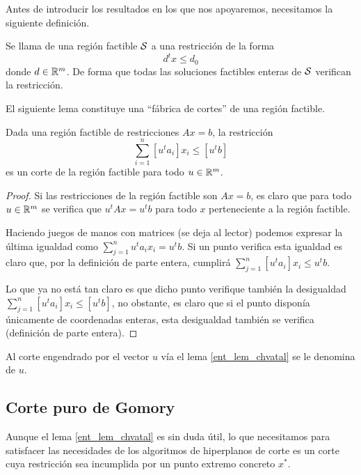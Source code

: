 Antes de introducir los resultados en los que nos apoyaremos, necesitamos la siguiente definición.
\begin{defi}[Corte]
	Se llama  de una región factible $\mathcal{S}$ a una restricción de la forma
	\begin{equation*}
		d^tx\leq d_0
	\end{equation*}
	donde $d\in\mathbb{R}^m$. De forma que todas las soluciones factibles enteras de $\mathcal{S}$ verifican la restricción.
\end{defi}
El siguiente lema constituye una ``fábrica de cortes'' de una región factible.
\begin{lem}
	\label{ent_lem_chvatal}
	Dada una región factible de restricciones $Ax=b$, la restricción
	\begin{equation*}
		\sum_{i=1}^{n}[u^ta_i]x_i\leq [u^tb]
	\end{equation*}
	es un corte de la región factible para todo $u\in\mathbb{R}^m$.
\end{lem}
\begin{proof}
	Si las restricciones de la región factible son $Ax=b$, es claro que para todo $u\in\mathbb{R}^m$ se verifica que $u^tAx=u^tb$ para todo $x$ perteneciente a la región factible.
	
	Haciendo juegos de manos con matrices (se deja al lector) podemos expresar la última igualdad como $\sum_{j=1}^{n}u^ta_ix_i=u^tb$. Si un punto verifica esta igualdad es claro que, por la definición de parte entera, cumplirá $\sum_{j=1}^{n}[u^ta_i]x_i\leq u^tb$.
	
	Lo que ya no está tan claro es que dicho punto verifique también la desigualdad $\sum_{j=1}^{n}[u^ta_i]x_i\leq [u^tb]$, no obstante, es claro que si el punto disponía únicamente de coordenadas enteras, esta desigualdad también se verifica (definición de parte entera).
\end{proof}
\begin{defi}
	Al corte engendrado por el vector $u$ vía el lema \ref{ent_lem_chvatal} se le denomina  de $u$.
\end{defi}
\subsection{Corte puro de Gomory}

Aunque el lema \ref{ent_lem_chvatal} es sin duda útil, lo que necesitamos para satisfacer las necesidades de los algoritmos de hiperplanos de corte es un corte cuya restricción sea incumplida por un punto extremo concreto $x^*$.

